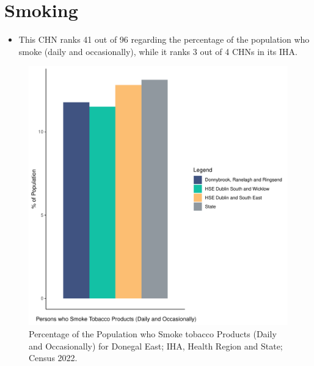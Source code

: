 \documentclass{article}
\begin{document}
\pagebreak

\section{Smoking}\label{sect:Smoking}
\begin{itemize}
\item This CHN ranks  41 out of 96 regarding the percentage of the population who smoke (daily and occasionally), while it ranks   3 out of 4 CHNs in its IHA.
\end{itemize}
\begin{figure}[H]
	\centering
	\includegraphics[width = 120mm]{../figures/SmokingED.pdf}
	\caption{Percentage of the Population who Smoke tobacco Products (Daily and Occasionally) for Donegal East; IHA, Health Region and State; Census 2022.}
	\label{fig:2ae19629-1a6a-13a3-e055-000000000001}
	\end{figure}
	
\end{document}
